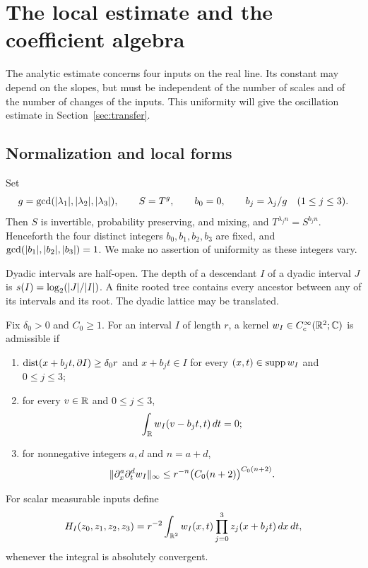 \section{The local estimate and the coefficient algebra}\label{sec:local}

The analytic estimate concerns four inputs on the real line. Its
constant may depend on the slopes, but must be independent of the number
of scales and of the number of changes of the inputs. This uniformity
will give the oscillation estimate in Section~\ref{sec:transfer}.

\subsection{Normalization and local forms}
Set
\[
 g=\gcd(\lvert\lambda_1\rvert,\lvert\lambda_2\rvert,\lvert\lambda_3\rvert),
 \qquad S=T^g,\qquad b_0=0,\qquad b_j=\lambda_j/g\quad(1\le j\le3).
\]
Then $S$ is invertible, probability preserving, and mixing, and
$T^{\lambda_j n}=S^{b_jn}$. Henceforth the four distinct integers
$b_0,b_1,b_2,b_3$ are fixed, and
$\gcd(\lvert b_1\rvert,\lvert b_2\rvert,\lvert b_3\rvert)=1$. We make no assertion of
uniformity as these integers vary.

Dyadic intervals are half-open. The depth of a descendant $I$ of a
dyadic interval $J$ is $s(I)=\log_2(\lvert J\rvert/\lvert I\rvert)$. A finite rooted
tree contains every ancestor between any of its intervals and its root.
The dyadic lattice may be translated.

\begin{definition}\label{def:kernels}
Fix $\delta_0>0$ and $C_0\ge1$. For an interval $I$ of length $r$, a kernel
$w_I\in C_c^\infty(\mathbb R^2;\mathbb C)$ is admissible if
\begin{enumerate}
\item $\operatorname{dist}(x+b_jt,\partial I)\ge\delta_0r$ and $x+b_jt\in I$ for every
$(x,t)\in\operatorname{supp} w_I$ and $0\le j\le3$;
\item for every $v\in\mathbb R$ and $0\le j\le3$,
\begin{equation}\label{eq:marginals}
 \int_\mathbb R w_I(v-b_jt,t)\,dt=0;
\end{equation}
\item for nonnegative integers $a,d$ and $n=a+d$,
\begin{equation}\label{eq:derivatives}
 \lVert\partial_x^a\partial_t^d w_I\rVert_\infty
 \le r^{-n}\bigl(C_0(n+2)\bigr)^{C_0(n+2)}.
\end{equation}
\end{enumerate}
For scalar measurable inputs define
\begin{equation}\label{eq:local-form}
 H_I(z_0,z_1,z_2,z_3)
 =r^{-2}\int_{\mathbb R^2} w_I(x,t)\prod_{j=0}^3z_j(x+b_jt)\,dx\,dt,
\end{equation}
whenever the integral is absolutely convergent.
\end{definition}


